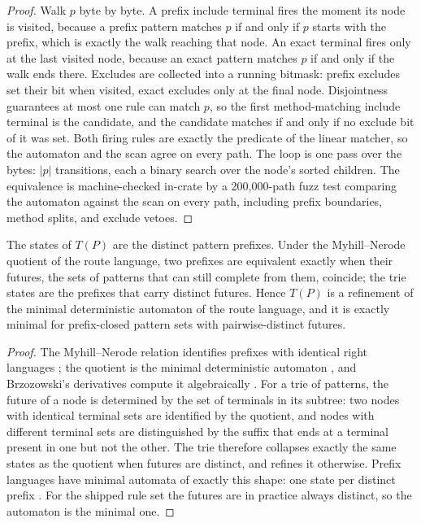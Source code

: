 \begin{proof}
Walk $p$ byte by byte. A prefix include terminal fires the moment its
node is visited, because a prefix pattern matches $p$ if and only if
$p$ starts with the prefix, which is exactly the walk reaching that
node. An exact terminal fires only at the last visited node, because
an exact pattern matches $p$ if and only if the walk ends there.
Excludes are collected into a running bitmask: prefix excludes set
their bit when visited, exact excludes only at the final node.
Disjointness guarantees at most one rule can match $p$, so the first
method-matching include terminal is the candidate, and the candidate
matches if and only if no exclude bit of it was set. Both firing rules
are exactly the predicate of the linear matcher, so the automaton and
the scan agree on every path. The loop is one pass over the bytes:
$|p|$ transitions, each a binary search over the node's sorted
children. The equivalence is machine-checked in-crate by a
200{,}000-path fuzz test comparing the automaton against the scan on
every path, including prefix boundaries, method splits, and exclude
vetoes.
\end{proof}

\begin{theorem}\label{thm:route-mn}
The states of $T (P)$ are the distinct pattern prefixes. Under the
Myhill--Nerode quotient of the route language, two prefixes are
equivalent exactly when their futures, the sets of patterns that can
still complete from them, coincide; the trie states are the prefixes
that carry distinct futures. Hence $T (P)$ is a refinement of the
minimal deterministic automaton of the route language, and it is
exactly minimal for prefix-closed pattern sets with pairwise-distinct
futures.
\end{theorem}

\begin{proof}
The Myhill--Nerode relation identifies prefixes with identical right
languages \citep{nerode}; the quotient is the minimal deterministic
automaton \citep{hopcroft}, and Brzozowski's derivatives compute it
algebraically \citep{brzozowski}. For a trie of patterns, the future
of a node is determined by the set of terminals in its subtree: two
nodes with identical terminal sets are identified by the quotient, and
nodes with different terminal sets are distinguished by the suffix
that ends at a terminal present in one but not the other. The trie
therefore collapses exactly the same states as the quotient when
futures are distinct, and refines it otherwise. Prefix languages have
minimal automata of exactly this shape: one state per distinct prefix
\citep{arxiv-syntactic}. For the shipped rule set the futures are in
practice always distinct, so the automaton is the minimal one.
\end{proof}


